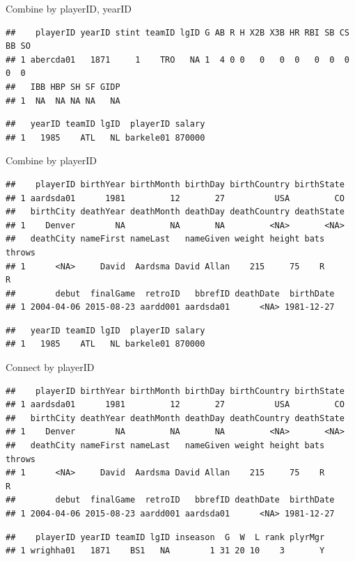 \documentclass[]{book}
\theoremstyle{definition}
\theoremstyle{definition}
\theoremstyle{definition}
\theoremstyle{remark}
\begin{document}
\begin{enumerate}
  Combine by playerID, yearID

\begin{verbatim}
##    playerID yearID stint teamID lgID G AB R H X2B X3B HR RBI SB CS BB SO
## 1 abercda01   1871     1    TRO   NA 1  4 0 0   0   0  0   0  0  0  0  0
##   IBB HBP SH SF GIDP
## 1  NA  NA NA NA   NA
\end{verbatim}

\begin{verbatim}
##   yearID teamID lgID  playerID salary
## 1   1985    ATL   NL barkele01 870000
\end{verbatim}

  Combine by playerID

\begin{verbatim}
##    playerID birthYear birthMonth birthDay birthCountry birthState
## 1 aardsda01      1981         12       27          USA         CO
##   birthCity deathYear deathMonth deathDay deathCountry deathState
## 1    Denver        NA         NA       NA         <NA>       <NA>
##   deathCity nameFirst nameLast   nameGiven weight height bats throws
## 1      <NA>     David  Aardsma David Allan    215     75    R      R
##        debut  finalGame  retroID   bbrefID deathDate  birthDate
## 1 2004-04-06 2015-08-23 aardd001 aardsda01      <NA> 1981-12-27
\end{verbatim}

\begin{verbatim}
##   yearID teamID lgID  playerID salary
## 1   1985    ATL   NL barkele01 870000
\end{verbatim}

  Connect by playerID

\begin{verbatim}
##    playerID birthYear birthMonth birthDay birthCountry birthState
## 1 aardsda01      1981         12       27          USA         CO
##   birthCity deathYear deathMonth deathDay deathCountry deathState
## 1    Denver        NA         NA       NA         <NA>       <NA>
##   deathCity nameFirst nameLast   nameGiven weight height bats throws
## 1      <NA>     David  Aardsma David Allan    215     75    R      R
##        debut  finalGame  retroID   bbrefID deathDate  birthDate
## 1 2004-04-06 2015-08-23 aardd001 aardsda01      <NA> 1981-12-27
\end{verbatim}

\begin{verbatim}
##    playerID yearID teamID lgID inseason  G  W  L rank plyrMgr
## 1 wrighha01   1871    BS1   NA        1 31 20 10    3       Y
\end{verbatim}


\end{enumerate}
\end{document}
